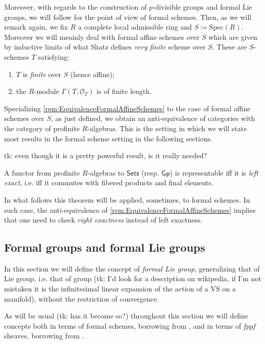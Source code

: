 \documentclass[../Main]{subfiles}
\begin{document}
\begin{rem}[]\label{rem:VeryFiniteSchemes}
	Moreover, with regards to the construction of $p$-divisible groups
	and formal Lie groups, we will follow \cite[\S5]{Shatz} for the point
	of view of formal schemes.
	Then, as we will remark again, we fix $R$ a 
	complete local admissible ring and $S \coloneqq \mathrm{Spec}(R)$.
	Moreover we will meainly deal with formal affine schemes over $S$ which
	are given by inductive limits of what Shatz defines {\em very finite} scheme over $S$.
	These are $S$-schemes $T$ satisfying:
	\begin{enumerate}
		\item $T$ is {\em finite} over $S$ (hence affine);
		\item the $R$-module $\Gamma \left( T , \mathcal{O}_{ T } \right)$
			is of finite length.
	\end{enumerate}
	Specializing \cref{rem:EquivalenceFormalAffineSchemes} to the case of
	formal affine schemes over $S$, 
	as just defined,
	we obtain an anti-equivalence of categories with the category of
	profinite $R$-algebras.
	This is the setting in which we will state most results in the 
	formal scheme setting in the following sections.
\end{rem}


tk: even though it is a pretty powerful result, is it really needed?
\begin{thm}
	A functor from profinite $R$-algebras to $\mathsf{Sets}$ (resp$.$ $\mathsf{Gp}$)
	is representable iff it is {\em left exact}, i.e.
	iff it commutes with fibered products and final elements.
\end{thm}
In what follows this theorem will be applied, sometimes,
to formal schemes. In such case, the anti-equivalence of \cref{rem:EquivalenceFormalAffineSchemes}
implies that one need to check {\em right exactness} instead of left exactness.

\subsection{Formal groups and formal Lie groups}
In this section we will define the concept of {\em formal Lie group},
generalizing that of Lie group, i.e. that of group (tk: I'd look for a description
on wikipedia, if I'm not mistaken it is the infinitesimal linear expansion of
the action of a VS on a manifold), without the restriction of convergence.

As will be usual (tk: has it become so?) throughout this section we will define
concepts both in terms of formal schemes, borrowing from \cite{Shatz},
and in terms of {\em fppf} sheaves, borrowing from \cite{Messing}.
\end{document}
